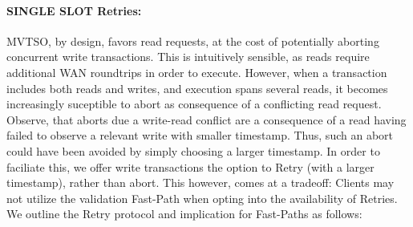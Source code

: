 \paragraph{SINGLE SLOT Retries:} 


MVTSO, by design, favors read requests, at the cost of potentially aborting concurrent write transactions. This is intuitively sensible, as reads require additional WAN roundtrips in order to execute. 
However, when a transaction includes both reads and writes, and execution spans several reads, it becomes increasingly suceptible to abort as consequence of a conflicting read request. Observe, that aborts due a write-read conflict are a consequence of a read having failed to observe a relevant write with smaller timestamp. Thus, such an abort could have been avoided by simply choosing a larger timestamp. In order to faciliate this, we offer write transactions the option to Retry (with a larger timestamp), rather than abort. This however, comes at a tradeoff: Clients may not utilize the validation Fast-Path when opting into the availability of Retries. We outline the Retry protocol and implication for Fast-Paths as follows:

